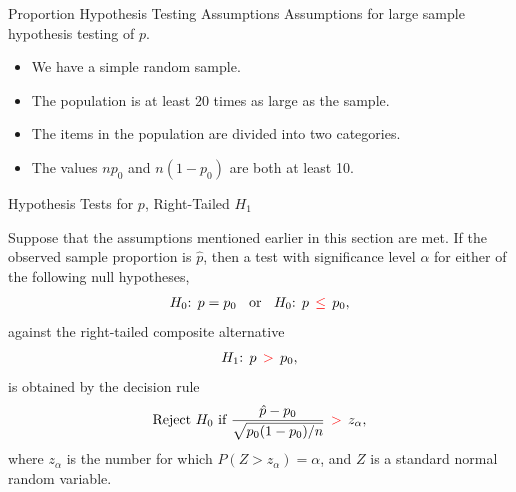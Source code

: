 \documentclass[pdf]{beamer}
\theoremstyle{remark}
\theoremstyle{definition}
\begin{document}
\begin{frame}[t]{Proportion Hypothesis Testing Assumptions}
Assumptions for large sample hypothesis testing of $p$. \\
\vspace{1.5ex}
\begin{itemize}
\item We have a simple random sample.
\item The population is at least 20 times as large as the sample.
\item The items in the population are divided into two categories.
\item The values $np_0$ and $n(1-p_0)$ are both at least 10.
\end{itemize}
\end{frame}

\begin{frame}[t, label=pRT]{Hypothesis Tests for $p$, Right-Tailed $H_1$}
\small
\begin{tcolorbox}[colback=white!5,colframe=franklinblue]%
Suppose that the assumptions mentioned earlier in this section are met. If the observed sample proportion is $\hat{p}$, then a test with significance level $\alpha$ for either of the following null hypotheses, 
\vspace{-1.0ex}
\begin{align*} 
H_0\text{: }  p = p_0 \;\; \text{ or } \;\; H_0\text{: }  p \;\, \textcolor{red}{\leq} \;\, p_0, 
\end{align*} 
\vspace{-1.0ex}
against the right-tailed composite alternative 
\vspace{0.0ex}
\begin{align*} 
H_1\text{: }  p \;\, \textcolor{red}{>} \;\, p_0, 
\end{align*} 
\vspace{-1.0ex}
is obtained by the decision rule 
\vspace{0.0ex}
\begin{equation} 
\text{Reject } H_0 \text{ if } \frac{\hat{p} - p_0}{\sqrt{p_0(1-p_0)/ n}} \;\, \textcolor{red}{>} \;\, z_{\alpha},
\end{equation} 
where $z_{\alpha}$ is the number for which $P(Z > z_{\alpha}) = \alpha$, and $Z$ is a standard normal random variable. 
\end{tcolorbox}
\end{frame}
\end{document}
